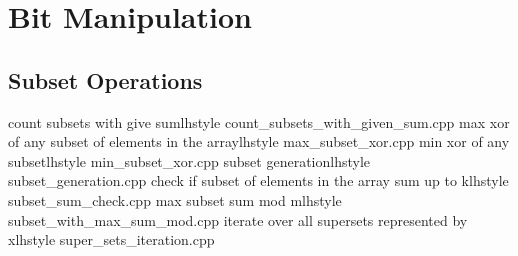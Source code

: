 \section{Bit Manipulation}
   \subsection{Subset Operations}
       {count subsets with give sum}{lhstyle} {count_subsets_with_given_sum.cpp}
       {max xor of any subset of elements in the array}{lhstyle} {max_subset_xor.cpp}
       {min xor of any subset}{lhstyle} {min_subset_xor.cpp}
       {subset generation}{lhstyle} {subset_generation.cpp}
       {check if subset of elements in the array sum up to k}{lhstyle} {subset_sum_check.cpp}
       {max subset sum mod m}{lhstyle} {subset_with_max_sum_mod.cpp}
       {iterate over all supersets represented by x}{lhstyle} {super_sets_iteration.cpp}
